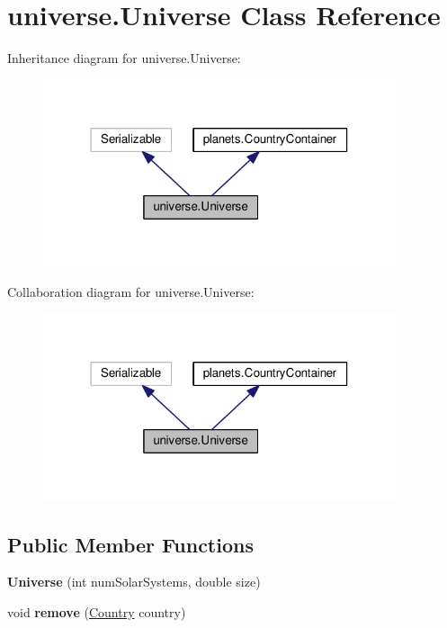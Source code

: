 \hypertarget{classuniverse_1_1_universe}{}\section{universe.\+Universe Class Reference}
\label{classuniverse_1_1_universe}


Inheritance diagram for universe.\+Universe\+:\nopagebreak
\begin{figure}[H]
\begin{center}
\leavevmode
\includegraphics[width=294pt]{classuniverse_1_1_universe__inherit__graph}
\end{center}
\end{figure}


Collaboration diagram for universe.\+Universe\+:\nopagebreak
\begin{figure}[H]
\begin{center}
\leavevmode
\includegraphics[width=294pt]{classuniverse_1_1_universe__coll__graph}
\end{center}
\end{figure}
\subsection*{Public Member Functions}
\begin{DoxyCompactItemize}
\item 
{\bfseries Universe} (int num\+Solar\+Systems, double size)\hypertarget{classuniverse_1_1_universe_a06681a37080b497e9c7b5de13c12635d}{}\label{classuniverse_1_1_universe_a06681a37080b497e9c7b5de13c12635d}

\item 
void {\bfseries remove} (\hyperlink{classplanets_1_1_country}{Country} country)\hypertarget{classuniverse_1_1_universe_af175e4b1f7094662a81bbd34707fde1a}{}\label{classuniverse_1_1_universe_af175e4b1f7094662a81bbd34707fde1a}

\end{DoxyCompactItemize}


